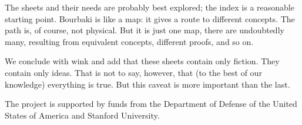 The sheets and their needs are probably
best explored;
the index is
a reasonable starting point.
Bourbaki is like a map: it gives
a route to different concepts.
The path is, of course, not physical.
But it is just one map, there are
undoubtedly many, resulting from
equivalent concepts, different proofs,
and so on.

We conclude with wink and add that these
sheets contain only fiction.
They contain only ideas.
That is not to say, however, that
(to the best of our knowledge)
everything is true.
But this caveat is more important
than the last.



\vfill

\begin{center}{\small The project is supported by
funds from the Department of
Defense of the United States of America
and Stanford University.}\end{center}
